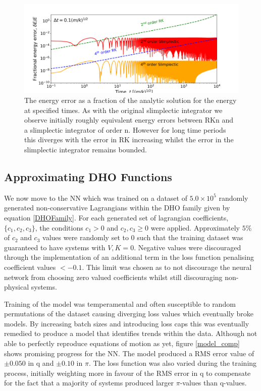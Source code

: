 \documentclass[10pt]{iopart}
\begin{document}
\begin{figure}
	\label{EnergyPlot}
	\includegraphics[width=\columnwidth]{EnergyPlot.png}
	\caption{The energy error as a fraction of the analytic solution for the energy at specified times. As with the original slimplectic integrator we observe initially roughly equivalent energy errors between RKn and a slimplectic integrator of order n. However for long time periods this diverges with the error in RK increasing whilst the error in the slimplectic integrator remains bounded.}
\end{figure}

\subsection{Approximating DHO Functions}
\label{NN Results}
We now move to the NN which was trained on a dataset of $5.0\times10^5$ randomly generated non-conservative Lagrangians within the DHO family given by equation \ref{DHOFamily}. For each generated set of lagrangian coefficients, $\{c_1,c_2,c_3\}$, the conditions $c_1 > 0$ and $c_2,c_3 \geq 0$ were applied. Approximately $5\%$ of $c_2$ and $c_3$ values were randomly set to 0 such that the training dataset was guaranteed to have systems with $V,K = 0$. Negative values were discouraged through the implementation of an additional term in the loss function penalising coefficient values $ < -0.1$. This limit was chosen as to not discourage the neural network from choosing zero valued coefficients whilst still discouraging non-physical systems. 

Training of the model was temperamental and often susceptible to random permutations of the dataset causing diverging loss values which eventually broke models. By increasing batch sizes and introducing loss caps this was eventually remedied to produce a model that identifies trends within the data. Although not able to perfectly reproduce equations of motion as yet, figure \ref{model_comp} shows promising progress for the NN. The model produced a RMS error value of $\pm0.050$ in q and $\pm0.10$ in $\pi$. The loss function was also varied during the training process, initially weighting more in favour of the RMS error in q to compensate for the fact that a majority of systems produced larger $\pi$-values than q-values. 
\end{document}

